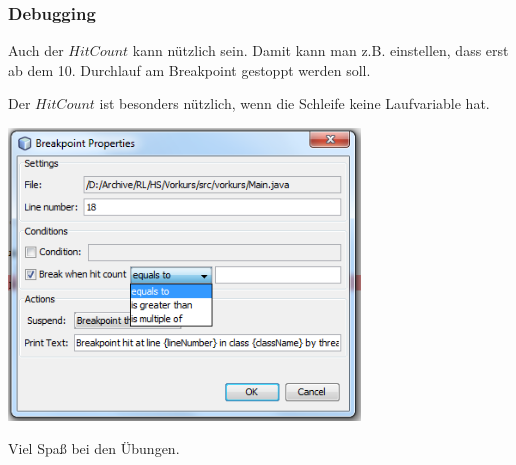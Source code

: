 \documentclass[final]{beamer}
\begin{document}
\begin{frame}
  \frametitle{Debugging}
  Auch der $Hit Count$ kann nützlich sein. Damit kann man z.B. einstellen, dass erst
  ab dem 10. Durchlauf am Breakpoint gestoppt werden soll.

  Der $Hit Count$ ist besonders nützlich, wenn die Schleife keine Laufvariable hat.

  \begin{center}
  \includegraphics[width=0.7\textwidth]{breakpoint_hitcount}
  \end{center}
\end{frame}

\begin{frame}
  \begin{center}
	\vfill
	\Huge{Viel Spaß bei den Übungen.}
	\vfill
  \end{center}
\end{frame}
\end{document}
